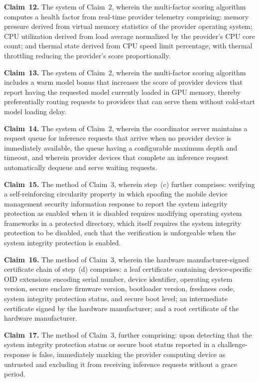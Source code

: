 \documentclass[11pt,letterpaper]{article}
\begin{document}
\textbf{Claim~12.} The system of Claim~2, wherein the multi-factor scoring algorithm computes a health factor from real-time provider telemetry comprising: memory pressure derived from virtual memory statistics of the provider operating system; CPU utilization derived from load average normalized by the provider's CPU core count; and thermal state derived from CPU speed limit percentage, with thermal throttling reducing the provider's score proportionally.

\textbf{Claim~13.} The system of Claim~2, wherein the multi-factor scoring algorithm includes a warm model bonus that increases the score of provider devices that report having the requested model currently loaded in GPU memory, thereby preferentially routing requests to providers that can serve them without cold-start model loading delay.

\textbf{Claim~14.} The system of Claim~2, wherein the coordinator server maintains a request queue for inference requests that arrive when no provider device is immediately available, the queue having a configurable maximum depth and timeout, and wherein provider devices that complete an inference request automatically dequeue and serve waiting requests.

\textbf{Claim~15.} The method of Claim~3, wherein step~(c) further comprises: verifying a self-reinforcing circularity property in which spoofing the mobile device management security information response to report the system integrity protection as enabled when it is disabled requires modifying operating system frameworks in a protected directory, which itself requires the system integrity protection to be disabled, such that the verification is unforgeable when the system integrity protection is enabled.

\textbf{Claim~16.} The method of Claim~3, wherein the hardware manufacturer-signed certificate chain of step~(d) comprises: a leaf certificate containing device-specific OID extensions encoding serial number, device identifier, operating system version, secure enclave firmware version, bootloader version, freshness code, system integrity protection status, and secure boot level; an intermediate certificate signed by the hardware manufacturer; and a root certificate of the hardware manufacturer.

\textbf{Claim~17.} The method of Claim~3, further comprising: upon detecting that the system integrity protection status or secure boot status reported in a challenge-response is false, immediately marking the provider computing device as untrusted and excluding it from receiving inference requests without a grace period.
\end{document}
